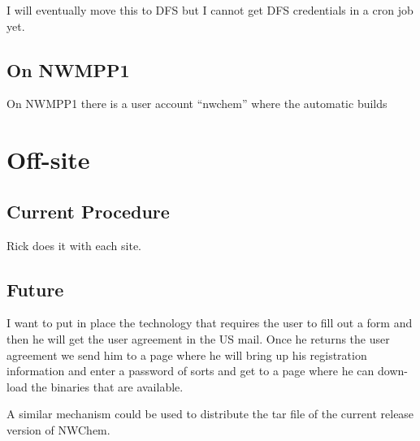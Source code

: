 I will eventually move this to DFS but I cannot get DFS credentials in
a cron job yet.  

\subsection{On NWMPP1}
On NWMPP1 there is a user account ``nwchem'' where the automatic
builds 

\section{Off-site}
\subsection{Current Procedure}
Rick does it with each site.
\subsection{Future}
I want to put in place the technology that requires the user to fill
out a form and then he will get the user agreement in the US mail.
Once he returns the user agreement we send him to a page where he will
bring up his registration information and enter a password of sorts
and get to a page where he can down-load the binaries that are
available.

A similar mechanism could be used to distribute the tar file of the
current release version of NWChem.



